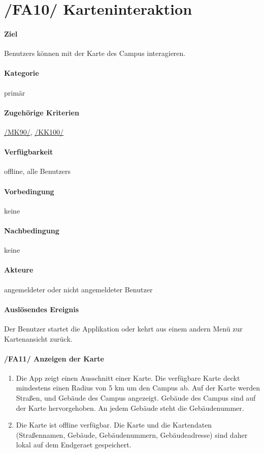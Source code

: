 \section[Karteninteraktion]{/FA10/ Karteninteraktion}
\label{/FA10/}
\paragraph{Ziel}
\Glspl{Benutzer} können mit der \Gls{Karte} des \Gls{Campus} interagieren.
\paragraph{Kategorie}
primär
\paragraph{Zugehörige Kriterien}
\hyperref[/MK90/]{/MK90/}, \hyperref[/KK100/]{/KK100/}
\paragraph{Verfügbarkeit}
\gls{offline}, alle \Glspl{Benutzer}
\paragraph{Vorbedingung}
keine
\paragraph{Nachbedingung}
keine
\paragraph{Akteure}
angemeldeter oder nicht angemeldeter \Gls{Benutzer}
\paragraph{Auslösendes Ereignis}
Der \Gls{Benutzer} startet die Applikation oder kehrt aus einem andern Menü zur \Gls{Kartenansicht} zurück.
\paragraph{/FA11/ Anzeigen der Karte}\label{/FA11/}
\begin{enumerate}
    \item Die App zeigt einen Ausschnitt einer \Gls{Karte}. Die verfügbare \Gls{Karte} deckt mindestens einen Radius von 5 km um den \Gls{Campus} ab. Auf der \Gls{Karte} werden Straßen, und Gebäude des \Gls{Campus} angezeigt. Gebäude des \Gls{Campus} sind auf der \Gls{Karte} hervorgehoben. An jedem Gebäude steht die Gebäudenummer.
    \item Die \Gls{Karte} ist \gls{offline} verfügbar. Die \Gls{Karte} und die Kartendaten (Straßennamen, Gebäude, Gebäudenummern, Gebäudeadresse) sind daher \gls{lokal} auf dem \Gls{Endgeraet} gespeichert.
\end{enumerate}
